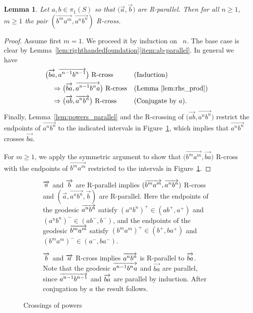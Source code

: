 \documentclass[11pt]{amsart}
\newcommand{\ora}[1]{\overrightarrow{#1}}
\newcommand*{\svgfignormal}[1]{\fontsize{9pt}{9pt}\selectfont}
\numberwithin{equation}{section}
\numberwithin{figure}{section}
\newtheorem{lemma}[theorem]{Lemma}
\theoremstyle{definition}
\theoremstyle{plain}
\begin{document}
\begin{lemma}
  Let  $a,b \in \pi_1(S)$ so that $\bigl(\ora{a},\ora{b}\bigr)$ are
  R-parallel. Then for all
  $n \ge 1$, $m \geq 1$ the pair $(\ora{b^ma^m},\ora{a^n
  b^n})$ R-cross.
\label{lem:anbn_vs_bkak}
\end{lemma}
\begin{proof}
  Assume first $m=1$.
  We proceed it by induction on~ $n$.
  The base case
 is clear by
 Lemma~\ref{lem:righthandedfoundation}\ref{item:ab-parallel}. In
 general we have
 \begin{align*}
   &\bigl(\ora{ba},\ora{a^{n-1}b^{n-1}}\bigr)\text{ R-cross}
     &&\text{(Induction)}\\
   &\quad\Rightarrow
     \bigl(\ora{ba},\ora{a^{n-1}b^n a}\bigr)\text{ R-cross}
     &&\text{(Lemma~\ref{lem:rhs_prod})}\\
   &\quad\Rightarrow
     \bigl(\ora{ab}, \ora{a^nb^n}\bigr)\text{ R-cross}
     &&\text{(Conjugate by~$a$)}.
 \end{align*}
Finally,
Lemma~\ref{lem:powers_parallel} and the R-crossing of 
$\bigl(\ora{ab}, \ora{a^nb^n}\bigr)$ restrict the
endpoints of $\ora{a^n b^n}$ to the indicated intervals in
Figure~\ref{fig:parallel_lemma}, which implies that $\ora{a^n b^n}$ crosses
$\ora{ba}$.

For $m \geq 1$, we apply the symmetric argument to show that 
$\bigl(\ora{b^ma^m}, \ora{ba}\bigr)$ R-cross with the endpoints of $\ora{b^ma^m}$ restricted to the intervals in Figure~\ref{fig:parallel_lemma}.
\end{proof}
\begin{figure}
     \begin{subfigure}[t]{0.48\textwidth}
\centerline{\svgfignormal{anbn_ba_c}}
    \caption{$\protect\ora{a}$ and $\protect\ora{b}$ are R-parallel
      implies $(\protect\ora{b^ma^m}, \protect\ora{a^n b^n})$ R-cross
      and $(\ora{a},\ora{a^n b^n}, \ora{b})$ are R-parallel. Here the endpoints of the geodesic $\protect\ora{a^nb^n}$ satisfy $(a^nb^n)^+ \in (ab^+, a^+)$ and $(a^nb^n)^- \in (ab^-, b^-)$, and the endpoints of the geodesic $\protect\ora{b^ma^m}$ satisfy $(b^ma^m)^+ \in (b^+, ba^+)$ and $(b^ma^m)^- \in (a^-, ba^-)$. }
    \label{fig:parallel_lemma}
  \end{subfigure}
  \hfill
    \begin{subfigure}[t]{0.48\textwidth}
 \centerline{\svgfignormal{anbn_ba_p}}
    \caption{$\protect\ora{b}$ and $\protect\ora{a}$ R-cross implies $\protect\ora{a^n b^n}$ is R-parallel to $\protect\ora{ba}$. Note that the geodesic $\protect\ora{a^{n-1}b^na}$ and $\ora{ba}$ are parallel, since $\protect\ora{a^{n-1}b^{n-1}}$ and $\protect\ora{ba}$ are parallel by induction. After conjugation by $a$ the result follows.}
    \label{fig:cross_lemma}
     \end{subfigure}
  \caption{Crossings of powers}
\end{figure}
\end{document}
